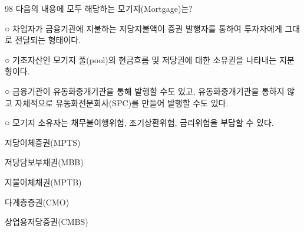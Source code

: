 \begin{question}{98}
다음의 내용에 모두 해당하는 모기지(Mortgage)는?
\begin{framedtext}
○ 차입자가 금융기관에 지불하는 저당지불액이 증권 발행자를 통하여 투자자에게 그대로 전달되는 형태이다. \par
○ 기초자산인 모기지 풀(pool)의 현금흐름 및 저당권에 대한 소유권을 나타내는 지분형이다. \par
○ 금융기관이 유동화중개기관을 통해 발행할 수도 있고, 유동화중개기관을 통하지 않고 자체적으로 유동화전문회사(SPC)를 만들어 발행할 수도 있다. \par
○ 모기지 소유자는 채무불이행위험, 조기상환위험, 금리위험을 부담할 수 있다.
\end{framedtext}
\begin{choices}
  \item 저당이체증권(MPTS)
  \item 저당담보부채권(MBB)
  \item 지불이체채권(MPTB)
  \item 다계층증권(CMO)
  \item 상업용저당증권(CMBS)
\end{choices}
\end{question}
